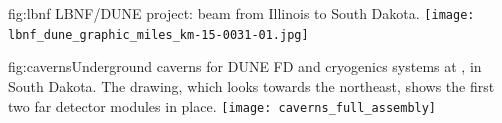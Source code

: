 

\begin{dunefigure}{fig:lbnf}{ 	
LBNF/DUNE project: beam from Illinois to South Dakota.}
\texttt{[image: lbnf\_dune\_graphic\_miles\_km-15-0031-01.jpg]}
\end{dunefigure}

\begin{dunefigure}{fig:caverns}{Underground caverns for DUNE FD and cryogenics systems at , in South Dakota. The drawing, which looks towards the northeast, shows the first two far detector modules in place.}
\texttt{[image: caverns\_full\_assembly]}
\end{dunefigure}


